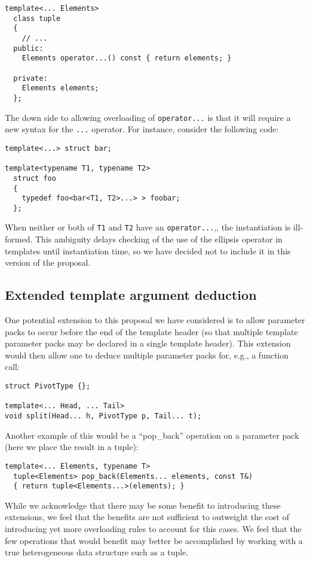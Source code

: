 \documentclass{article}
\begin{document}
\begin{verbatim}
template<... Elements>
  class tuple 
  {
    // ...
  public:
    Elements operator...() const { return elements; }

  private:
    Elements elements;
  };
\end{verbatim}

The down side to allowing overloading of \texttt{operator...} is that
it will require a new syntax for the \texttt{...} operator. For
instance, consider the following code:

\begin{verbatim}
template<...> struct bar;

template<typename T1, typename T2>
  struct foo
  {
    typedef foo<bar<T1, T2>...> > foobar;
  };
\end{verbatim}

When neither or both of \texttt{T1} and \texttt{T2} have an
\texttt{operator...},, the instantiation is ill-formed. This ambiguity
delays checking of the use of the ellipsis operator in templates until
instantiation time, so we have decided not to include it in this
version of the proposal.

\subsection{Extended template argument deduction}
One potential extension to this proposal we have considered is to
allow parameter packs to occur before the end of the template header
(so that multiple template parameter packs may be declared in a single
template header). This extension would then allow one to deduce
multiple parameter packs for, e.g., a function call:

\begin{verbatim}
struct PivotType {};

template<... Head, ... Tail>
void split(Head... h, PivotType p, Tail... t);
\end{verbatim}

Another example of this would be a ``pop\_back'' operation on a
parameter pack (here we place the result in a tuple):

\begin{verbatim}
template<... Elements, typename T>
  tuple<Elements> pop_back(Elements... elements, const T&)
  { return tuple<Elements...>(elements); }
\end{verbatim}

While we acknowledge that there may be some benefit to introducing
these extensions, we feel that the benefits are not sufficient to
outweight the cost of introducing yet more overloading rules to
account for this cases. We feel that the few operations that would
benefit may better be accomplished by working with a true
heterogeneous data structure such as a tuple.
\end{document}

